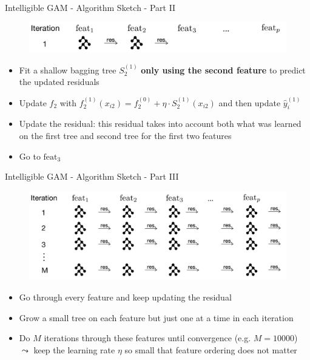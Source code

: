 \documentclass[11pt,compress,t,notes=noshow, aspectratio=169, xcolor=table]{beamer}
\begin{document}
\begin{frame}{Intelligible GAM - Algorithm Sketch - Part II}
\begin{figure}
    \centering
    \includegraphics[width=1\linewidth]{figure/EBM_Step2.png}
    \label{fig:Intelligible EBM_Step2}
\end{figure}
\begin{itemize}
    \item Fit a shallow bagging tree $S_2^{(1)}$ \textbf{only using the second feature} to predict the updated residuals
    \item Update $f_2$ with $f_2^{(1)}(x_{i2})=f_2^{(0)}+\eta\cdot S_2^{(1)}(x_{i2})$ and then update $\hat{y}_i^{(1)}$
    \item Update the residual: this residual takes into account both what was learned on the first tree and second tree for the first two features
    \item Go to $\text{feat}_3$
\end{itemize}

\end{frame}

\begin{frame}{Intelligible GAM - Algorithm Sketch - Part III}
\begin{figure}
    \centering
    \includegraphics[width=1\linewidth]{figure/EBM_Step3.png}
    \label{fig:Intelligible EBM_Step3}
\end{figure}
\begin{itemize}
    \item Go through every feature and keep updating the residual
    \item Grow a small tree on each feature but just one at a time in each iteration
    \item Do $M$ iterations through these features until convergence (e.g. $M=10000$) \\
    $\leadsto$ keep the learning rate $\eta$ so small that feature ordering does not matter
\end{itemize}

\end{frame}
\end{document}
